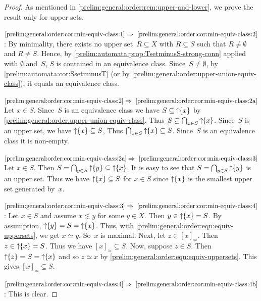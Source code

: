 \begin{proof}
	As mentioned in \cref{prelim:general:order:rem:upper-and-lower}, we prove the result only for upper sets.
	
$\ref{prelim:general:order:cor:min-equiv-class:1}\Rightarrow~\ref{prelim:general:order:cor:min-equiv-class:2}$: By minimality, there exists no upper set~$R \subseteq X$ with $R \subseteq S$
 such that $R \ne \emptyset$ and $R \ne S$.
 Hence, by \cref{prelim:automata:prop:TsetminusS-strong-conn} applied with $\emptyset$ and~$S$, 
 $S$ is contained in an equivalence class.
 Since~$S \ne \emptyset$, by \cref{prelim:automata:cor:SsetminusT} (or by \cref{prelim:general:order:upper-union-equiv-class}), 
 it equals an equivalence class.

$\ref{prelim:general:order:cor:min-equiv-class:2}\Rightarrow~\ref{prelim:general:order:cor:min-equiv-class:2a}$
 Let $x \in S$. Since~$S$ is an equivalence class we have $S \subseteq \mbox{\ensuremath{\displaystyle \uparrow \!\!\{x\}}}$
 by \cref{prelim:general:order:upper-union-equiv-class}.
 Thus $S \subseteq \bigcap_{x \in S} \mbox{\ensuremath{\displaystyle \uparrow \!\!\{x\}}}$.
 Since~$S$ is an upper set, we have $\mbox{\ensuremath{\displaystyle \uparrow \!\!\{x\}}} \subseteq S$,
 Thus $\bigcap_{x \in S} \mbox{\ensuremath{\displaystyle \uparrow \!\!\{x\}}} \subseteq S$. Since~$S$ 
 is an equivalence class it is non-empty.
 
$\ref{prelim:general:order:cor:min-equiv-class:2a}\Rightarrow~\ref{prelim:general:order:cor:min-equiv-class:3}$
 Let $x \in S$. Then $S = \bigcap_{y \in S}\mbox{\ensuremath{\displaystyle \uparrow \!\!\{y\}}} \subseteq \mbox{\ensuremath{\displaystyle \uparrow \!\!\{x\}}}$.
 It is easy to see that $S = \bigcap_{y \in S} \mbox{\ensuremath{\displaystyle \uparrow \!\!\{y\}}}$ is an upper
 set. Thus we have $\mbox{\ensuremath{\displaystyle \uparrow \!\!\{x\}}} \subseteq S$ for $x \in S$
 since $\mbox{\ensuremath{\displaystyle \uparrow \!\!\{x\}}}$ is the smallest upper set generated by~$x$.  

$\ref{prelim:general:order:cor:min-equiv-class:3}\Rightarrow~\ref{prelim:general:order:cor:min-equiv-class:4}$: Let $x \in S$ and assume $x \lesssim y$ for some $y \in X$. Then $y \in \mbox{\ensuremath{\displaystyle \uparrow \!\!\{x\}}} = S$.
By assumption, $\mbox{\ensuremath{\displaystyle \uparrow \!\!\{y\}}} = S = \mbox{\ensuremath{\displaystyle \uparrow \!\!\{x\}}}$.
Thus, with \cref{prelim:general:order:eqn:equiv-uppersets}, we get $x \simeq y$.
So~$x$ is maximal.
Next, let $z \in [x]_{\simeq}$.
Then $z \in \mbox{\ensuremath{\displaystyle \uparrow \!\!\{x\}}} = S$. Thus we have $[x]_{\simeq} \subseteq S$.
Now, suppose $z \in S$. Then $\mbox{\ensuremath{\displaystyle \uparrow \!\!\{z\}}} = S = \mbox{\ensuremath{\displaystyle \uparrow \!\!\{x\}}}$
and so $z \simeq x$ by \cref{prelim:general:order:eqn:equiv-uppersets}.
This gives $[x]_{\simeq} \subseteq S$.

$\ref{prelim:general:order:cor:min-equiv-class:4}\Rightarrow~\ref{prelim:general:order:cor:min-equiv-class:4b}$: This is clear.


\end{proof}
